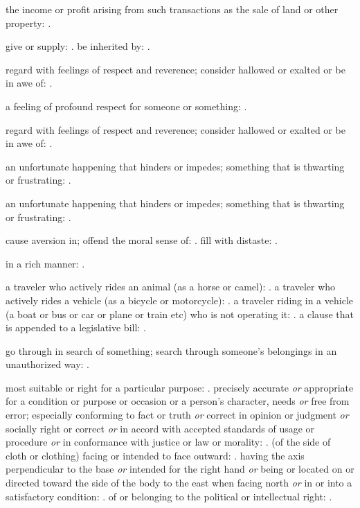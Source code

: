   the income or profit arising from such transactions as the sale of land or other property: .

  give or supply: . be inherited by: .

  regard with feelings of respect and reverence; consider hallowed or exalted or be in awe of: .

  a feeling of profound respect for someone or something: .

  regard with feelings of respect and reverence; consider hallowed or exalted or be in awe of: .

  an unfortunate happening that hinders or impedes; something that is thwarting or frustrating: .

  an unfortunate happening that hinders or impedes; something that is thwarting or frustrating: .

  cause aversion in; offend the moral sense of: . fill with distaste: .

  in a rich manner: .

  a traveler who actively rides an animal (as a horse or camel):   . a traveler who actively rides a vehicle (as a bicycle or motorcycle): . a traveler riding in a vehicle (a boat or bus or car or plane or train etc) who is not operating it: . a clause that is appended to a legislative bill: .

  go through in search of something; search through someone's belongings in an unauthorized way: .

  most suitable or right for a particular purpose: . precisely accurate \textit{or} appropriate for a condition or purpose or occasion or a person's character, needs \textit{or} free from error; especially conforming to fact or truth \textit{or} correct in opinion or judgment \textit{or} socially right or correct \textit{or} in accord with accepted standards of usage or procedure \textit{or} in conformance with justice or law or morality: . (of the side of cloth or clothing) facing or intended to face outward: . having the axis perpendicular to the base \textit{or} intended for the right hand \textit{or} being or located on or directed toward the side of the body to the east when facing north \textit{or} in or into a satisfactory condition: . of or belonging to the political or intellectual right: .

